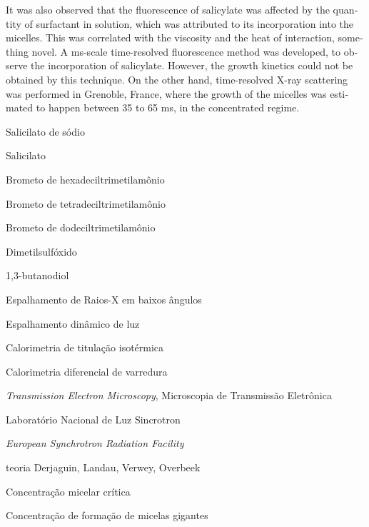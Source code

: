 \documentclass[
	12pt,				%
	oneside,
	a4paper,			%
	english,			%
	brazil%
	]{abntex2}
\newcommand{\Sal}{Sal\textsuperscript{--}}
\newcommand{\cmc}{CMC}
\newcommand{\cwlm}{\(\mathrm{C}_{\mathrm{WLM}}\)}
\newcommand{\CTAB}{C\textsubscript{16}TAB}
\newcommand{\TTAB}{C\textsubscript{14}TAB}
\newcommand{\DTAB}{C\textsubscript{12}TAB}
\newcommand{\BD}{1,3-BD}
\begin{document}
\begin{resumo}[Abstract]
\begin{english}
 	It was also observed that the fluorescence of salicylate was affected by the quantity of surfactant in solution, which was attributed to its incorporation into the micelles. This was correlated with the viscosity and the heat of interaction, something novel. A ms-scale time-resolved fluorescence method was developed, to observe the incorporation of salicylate. However, the growth kinetics could not be obtained by this technique. On the other hand, time-resolved X-ray scattering was performed in Grenoble, France, where the growth of the micelles was estimated to happen between 35 to 65 ms, in the concentrated regime.
 	
   \vspace{\onelineskip}
 
   \noindent 
 \end{english}
\end{resumo}




\listoffigures*
\cleardoublepage

\listoftables*
\listoflistings
\cleardoublepage

\begin{siglas}
  \item[NaSal] Salicilato de sódio
  \item[\Sal] Salicilato
  \item[\CTAB] Brometo de hexadeciltrimetilamônio
  \item[\TTAB] Brometo de tetradeciltrimetilamônio
  \item[\DTAB] Brometo de dodeciltrimetilamônio
  \item[DMSO] Dimetilsulfóxido
  \item[\BD] 1,3-butanodiol
  \item[SAXS] Espalhamento de Raios-X em baixos ângulos
  \item[DLS] Espalhamento dinâmico de luz
  \item[ITC] Calorimetria de titulação isotérmica
  \item[DSC] Calorimetria diferencial de varredura
  \item[TEM] \emph{Transmission Electron Microscopy}, Microscopia de Transmissão Eletrônica
  \item[LNLS] Laboratório Nacional de Luz Sincrotron
  \item[ESRF] \emph{European Synchrotron Radiation Facility}
  \item[DLVO] teoria Derjaguin, Landau, Verwey, Overbeek
  \item[\cmc] Concentração micelar crítica
  \item[\cwlm] Concentração de formação de micelas gigantes
  
\end{siglas}
\end{document}
